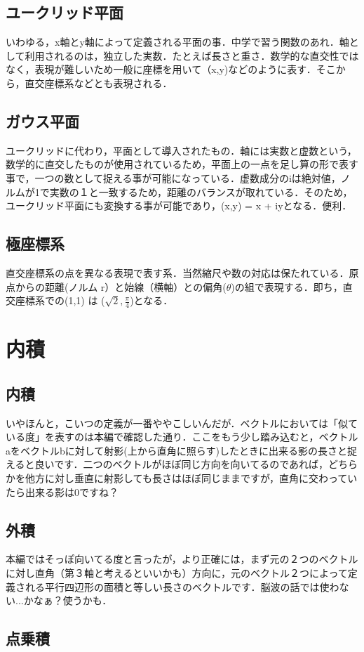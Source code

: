 \documentclass[11pt,a4paper]{jreport}
\begin{document}
\subsection{ユークリッド平面}
いわゆる，x軸とy軸によって定義される平面の事．中学で習う関数のあれ．軸として利用されるのは，独立した実数．たとえば長さと重さ．数学的な直交性ではなく，表現が難しいため一般に座標を用いて（x,y)などのように表す．そこから，直交座標系などとも表現される．
\subsection{ガウス平面}
ユークリッドに代わり，平面として導入されたもの．軸には実数と虚数という，数学的に直交したものが使用されているため，平面上の一点を足し算の形で表す事で，一つの数として捉える事が可能になっている．虚数成分のiは絶対値，ノルムが1で実数の１と一致するため，距離のバランスが取れている．そのため，ユークリッド平面にも変換する事が可能であり，(x,y) = x + iyとなる．便利．
\subsection{極座標系}
直交座標系の点を異なる表現で表す系．当然縮尺や数の対応は保たれている．原点からの距離(ノルム r）と始線（横軸）との偏角($\theta$)の組で表現する．即ち，直交座標系での(1,1) は ($\sqrt{2}, \frac{\pi}{4}$)となる．

\section{内積}
\subsection{内積}
いやほんと，こいつの定義が一番ややこしいんだが．ベクトルにおいては「似ている度」を表すのは本編で確認した通り．ここをもう少し踏み込むと，ベクトルaをベクトルbに対して射影(上から直角に照らす)したときに出来る影の長さと捉えると良いです．二つのベクトルがほぼ同じ方向を向いてるのであれば，どちらかを他方に対し垂直に射影しても長さはほぼ同じままですが，直角に交わっていたら出来る影は0ですね？
\subsection{外積}
本編ではそっぽ向いてる度と言ったが，より正確には，まず元の２つのベクトルに対し直角（第３軸と考えるといいかも）方向に，元のベクトル２つによって定義される平行四辺形の面積と等しい長さのベクトルです．脳波の話では使わない...かなぁ？使うかも．
\subsection{点乗積}
\end{document}
